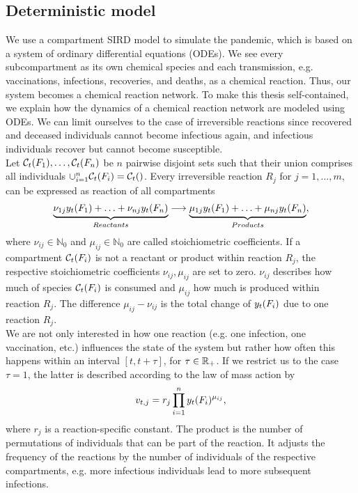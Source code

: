 \subsection{Deterministic model}
We use a compartment SIRD model to simulate the pandemic, which is based on a system of ordinary differential equations (ODEs). We see every subcompartment as its own chemical species and each transmission, e.g. vaccinations, infections, recoveries, and deaths, as a chemical reaction. Thus, our system becomes a chemical reaction network. To make this thesis self-contained, we explain how the dynamics of a chemical reaction network are modeled using ODEs. We can limit ourselves to the case of irreversible reactions since recovered and deceased individuals cannot become infectious again, and infectious individuals recover but cannot become susceptible. \\

Let $\mathcal{C}_t(F_1), \dots, \mathcal{C}_t(F_n)$ be $n$ pairwise disjoint sets such that their union comprises all individuals $\cup_{i=1}^n \mathcal{C}_t(F_i) = \mathcal{C}_t()$. Every irreversible reaction $R_j$ for $j = 1, \dots, m$, can be expressed as reaction of all compartments
\begin{align}
\underbrace{\nu_{1j} y_t(F_1) + \hdots + \nu_{nj} y_t(F_n)}_{Reactants} \longrightarrow \underbrace{\mu_{1j} y_t(F_1) + \hdots + \mu_{nj} y_t(F_n)}_{Products},
\end{align}
where $\nu_{ij} \in \mathbb{N}_0$ and $\mu_{ij} \in \mathbb{N}_0$ are called stoichiometric coefficients. If a compartment $\mathcal{C}_t(F_i)$ is not a reactant or product within reaction $R_j$, the respective stoichiometric coefficients $\nu_{ij}, \mu_{ij}$ are set to zero. $\nu_{ij}$ describes how much of species $\mathcal{C}_t(F_i)$ is consumed and $\mu_{ij}$ how much is produced within reaction $R_j$. The difference $\mu_{ij} - \nu_{ij}$ is the total change of $y_t(F_i)$ due to one reaction $R_j$.\\

We are not only interested in how one reaction (e.g. one infection, one vaccination, etc.) influences the state of the system but rather how often this happens within an interval $[t, t+\tau]$, for $\tau \in \mathbb{R}_+$. If we restrict us to the case $\tau = 1$, the latter is described according to the law of mass action by
\begin{align}
\label{eq:change_one_unit}
v_{t,j} = r_j  \prod_{i=1}^n y_t(F_i)^{\mu_{ij}},
\end{align}
where $r_j$ is a reaction-specific constant. The product is the number of permutations of individuals that can be part of the reaction. It adjusts the frequency of the reactions by the number of individuals of the respective compartments, e.g. more infectious individuals lead to more subsequent infections.

